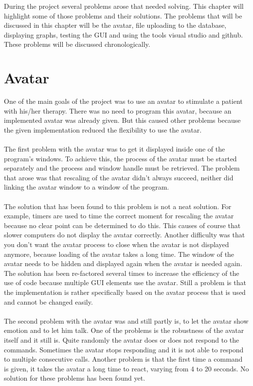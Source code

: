 During the project several problems arose that needed solving. This chapter will highlight some of those problems and their solutions. The problems that will be discussed in this chapter will be the avatar, file uploading to the database, displaying graphs, testing the GUI and using the tools visual studio and github. These problems will be discussed chronologically.
\section{Avatar}
One of the main goals of the project was to use an avatar to stimulate a patient with his/her therapy. There was no need to program this avatar, because an implemented avatar was already given. But this caused other problems because the given implementation reduced the flexibility to use the avatar. 
\paragraph{}
The first problem with the avatar was to get it displayed inside one of the program's windows. To achieve this, the process of the avatar must be started separately and the process and window handle must be retrieved. The problem that arose was that rescaling of the avatar didn't always succeed, neither did linking the avatar window to a window of the program. 
\paragraph{}
The solution that has been found to this problem is not a neat solution. For example, timers are used to time the correct moment for rescaling the avatar because no clear point can be determined to do this. This causes of course that slower computers do not display the avatar correctly.
Another difficulty was that you don't want the avatar process to close when the avatar is not displayed anymore, because loading of the avatar takes a long time. The window of the avatar needs to be hidden and displayed again when the avatar is needed again.
The solution has been re-factored several times to increase the efficiency of the use of code because multiple GUI elements use the avatar. Still a problem is that the implementation is rather specifically based on the avatar process that is used and cannot be changed easily.
\paragraph{}
The second problem with the avatar was and still partly is, to let the avatar show emotion and to let him talk. One of the problems is the robustness of the avatar itself and it still is.  Quite randomly the avatar does or does not respond to the commands. Sometimes the avatar stops responding and it is not able to respond to multiple consecutive calls. Another problem is that the first time a command is given, it takes the avatar a long time to react, varying from 4 to 20 seconds. No solution for these problems has been found yet.
